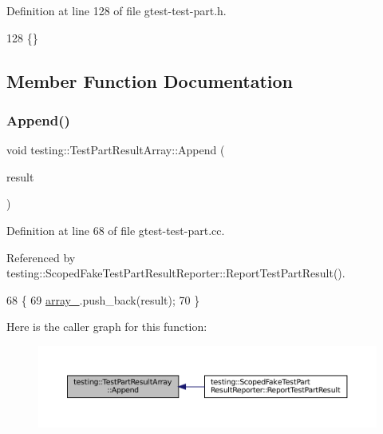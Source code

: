 Definition at line 128 of file gtest-\/test-\/part.\+h.


\begin{DoxyCode}
128 \{\}
\end{DoxyCode}


\subsection{Member Function Documentation}
\mbox{\label{classtesting_1_1TestPartResultArray_a01844bd505b18a666324617a1b459558}} 
\subsubsection{\texorpdfstring{Append()}{Append()}}
{\footnotesize\ttfamily void testing\+::\+Test\+Part\+Result\+Array\+::\+Append (\begin{DoxyParamCaption}\item[{const \hyperlink{classtesting_1_1TestPartResult}{Test\+Part\+Result} \&}]{result }\end{DoxyParamCaption})}



Definition at line 68 of file gtest-\/test-\/part.\+cc.



Referenced by testing\+::\+Scoped\+Fake\+Test\+Part\+Result\+Reporter\+::\+Report\+Test\+Part\+Result().


\begin{DoxyCode}
68                                                              \{
69   \hyperlink{classtesting_1_1TestPartResultArray_a288da4fd16773d079722d6824a63060f}{array\_}.push\_back(result);
70 \}
\end{DoxyCode}
Here is the caller graph for this function\+:
\nopagebreak
\begin{figure}[H]
\begin{center}
\leavevmode
\includegraphics[width=350pt]{classtesting_1_1TestPartResultArray_a01844bd505b18a666324617a1b459558_icgraph}
\end{center}
\end{figure}
\mbox{\label{classtesting_1_1TestPartResultArray_aa44d02a01c87f47393b07951bab6e025}} 
